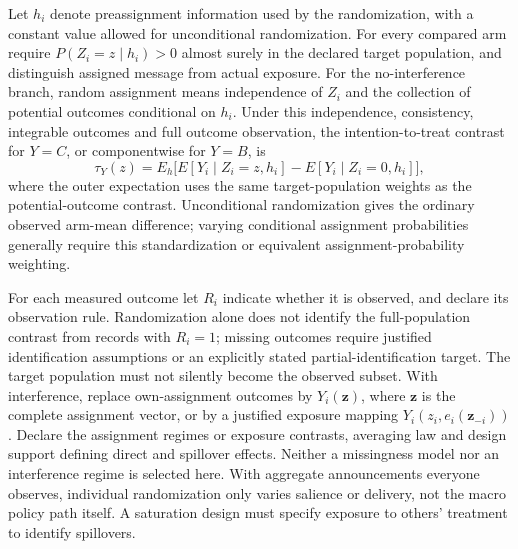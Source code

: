 \documentclass[11pt,a4paper]{article}
\begin{document}
Let \(h_i\) denote preassignment information used by the randomization, with a constant value allowed for unconditional randomization. For every compared arm require \(P(Z_i=z\mid h_i)>0\) almost surely in the declared target population, and distinguish assigned message from actual exposure. For the no-interference branch, random assignment means independence of \(Z_i\) and the collection of potential outcomes conditional on \(h_i\). Under this independence, consistency, integrable outcomes and full outcome observation, the intention-to-treat contrast for \(Y=C\), or componentwise for \(Y=B\), is
\[
 \tau_Y(z)=E_{h}\bigl[E[Y_i\mid Z_i=z,h_i]-E[Y_i\mid Z_i=0,h_i]\bigr],
\]
where the outer expectation uses the same target-population weights as the potential-outcome contrast. Unconditional randomization gives the ordinary observed arm-mean difference; varying conditional assignment probabilities generally require this standardization or equivalent assignment-probability weighting.

For each measured outcome let \(R_i\) indicate whether it is observed, and declare its observation rule. Randomization alone does not identify the full-population contrast from records with \(R_i=1\); missing outcomes require justified identification assumptions or an explicitly stated partial-identification target. The target population must not silently become the observed subset. With interference, replace own-assignment outcomes by \(Y_i(\mathbf z)\), where \(\mathbf z\) is the complete assignment vector, or by a justified exposure mapping \(Y_i(z_i,e_i(\mathbf z_{-i}))\). Declare the assignment regimes or exposure contrasts, averaging law and design support defining direct and spillover effects. Neither a missingness model nor an interference regime is selected here. With aggregate announcements everyone observes, individual randomization only varies salience or delivery, not the macro policy path itself. A saturation design must specify exposure to others' treatment to identify spillovers.
\end{document}
